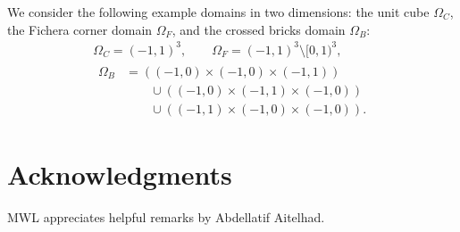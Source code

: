 \documentclass[10pt,letterpaper]{article}
\begin{document}
We consider the following example domains in two dimensions:
the unit cube $\Omega_C$, the Fichera corner domain $\Omega_F$, and the crossed bricks domain $\Omega_{B}$:
\begin{gather*}
    \Omega_{C}  = (-1,1)^3,
    \qquad 
    \Omega_{F}  = (-1,1)^3 \setminus [0,1)^3,
    \\
    \begin{aligned}
    \Omega_{B} &= 
    \left( (-1,0) \times (-1,0) \times (-1,1) \right)
    \\&\qquad
    \cup 
    \left( (-1,0) \times (-1,1) \times (-1,0) \right)
    \\&\qquad
    \cup 
    \left( (-1,1) \times (-1,0) \times (-1,0) \right)
    .
    \end{aligned}
\end{gather*}











\section*{Acknowledgments}

MWL appreciates helpful remarks by Abdellatif Aitelhad.



\end{document}
